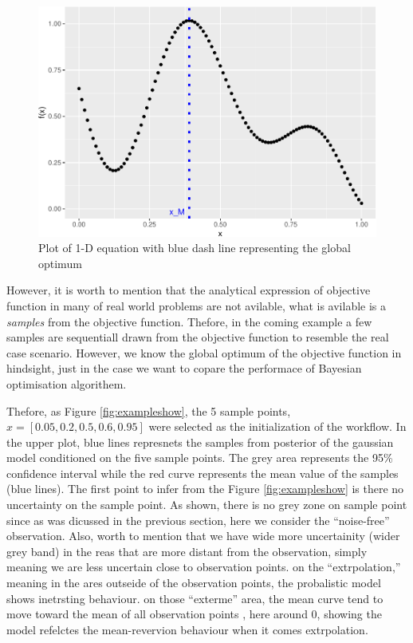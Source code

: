 \documentclass[]{elsarticle} %
\begin{document}
\begin{eqution}
\begin{figure}
{\centering \includegraphics[width=0.9\linewidth]{0_Paper1_main_files/figure-latex/onedplot-1} 

}

\caption{Plot of 1-D equation with blue dash line representing the global optimum}\label{fig:onedplot}
\end{figure}

However, it is worth to mention that the analytical expression of objective function in many of real world problems are not avilable, what is avilable is a \emph{samples} from the objective function. Thefore, in the coming example a few samples are sequentiall drawn from the objective function to resemble the real case scenario. However, we know the global optimum of the objective function in hindsight, just in the case we want to copare the performace of Bayesian optimisation algorithem.

Thefore, as Figure \ref{fig:exampleshow}, the 5 sample points, \(x=[0.05,0.2,0.5,0.6,0.95]\) were selected as the initialization of the workflow. In the upper plot, blue lines represnets the samples from posterior of the gaussian model conditioned on the five sample points. The grey area represents the 95\% confidence interval while the red curve represents the mean value of the samples (blue lines). The first point to infer from the Figure \ref{fig:exampleshow} is there no uncertainty on the sample point. As shown, there is no grey zone on sample point since as was dicussed in the previous section, here we consider the ``noise-free'' observation. Also, worth to mention that we have wide more uncertainity (wider grey band) in the reas that are more distant from the observation, simply meaning we are less uncertain close to observation points. on the ``extrpolation,'' meaning in the ares outseide of the observation points, the probalistic model shows inetrsting behaviour. on those ``exterme'' area, the mean curve tend to move toward the mean of all observation points , here around 0, showing the model refelctes the mean-revervion behaviour when it comes extrpolation.


\end{eqution}
\end{document}
